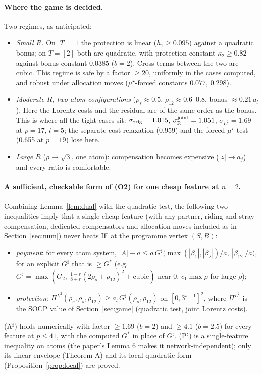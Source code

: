 \documentclass[11pt]{article}
\theoremstyle{definition}
\begin{document}
\paragraph{Where the game is decided.}  Two regimes, as anticipated:
\begin{itemize}
\item[(S)] \emph{Small $R$.}  On $|T|=1$ the protection is linear ($h_1\ge0.095$) against a quadratic bonus; on $T=[2]$ both are quadratic, with protection
constant $\kappa_2\ge0.82$ against bonus constant $0.0385$ ($b=2$).  Cross terms between the two are cubic.  This regime is safe by a factor $\ge20$, uniformly in
the cases computed, and robust under allocation moves ($\mu^\star$-forced constants $0.077$, $0.298$).
\item[(L)] \emph{Moderate $R$, two-atom configurations} ($\rho_s\approx0.5$, $\rho_{12}\approx0.6$--$0.8$, bonus $\approx0.21\,a_l$).  Here the Lorentz
costs and the residual are of the same order as the bonus.  This is where all the tight cases sit: $\sigma_{\rm orig}=1.015$, $\sigma^{\rm joint}_{\rm R}=1.051$,
$\sigma_{L^2}=1.69$ at $p=17$, $l=5$; the separate-cost relaxation (0.959) and the forced-$\mu^\star$ test (0.655 at $p=19$) lose here.
\item[(X)] \emph{Large $R$} ($\rho\to\sqrt3$, one atom): compensation becomes expensive ($|z|\to a_j$) and every ratio is comfortable.
\end{itemize}

\paragraph{A sufficient, checkable form of (O2) for one cheap feature at $n=2$.}  Combining Lemma~\ref{lem:dual} with the quadratic test, the
following two inequalities imply that a single cheap feature (with any partner, riding and stray compensation, dedicated compensators and allocation moves
included as in Section~\ref{sec:num}) never beats IF at the programme vertex $(S,B)$:
\begin{itemize}
\item[(P$^\sharp$)] \emph{payment}: for every atom system, $|A|-a\le a\,G^\sharp\big(\max(|\beta_1|,|\beta_2|)/a,\ |\beta_{12}|/a\big)$, for an explicit
$G^\sharp$ that is $\ge G^*$ (e.g.\ $G^\sharp=\max(G_2,\ \frac{1-r}{8+r}(2\rho_s+\rho_{12})^2+\text{cubic})$ near $0$, $c_1\max\rho$ for large $\rho$);
\item[(A$^\sharp$)] \emph{protection}: $\Pi^{L^2}(\rho_s,\rho_s,\rho_{12})\ge a_l\,G^\sharp(\rho_s,\rho_{12})$ on $[0,3^{s-1}]^2$, where $\Pi^{L^2}$ is the SOCP value of
Section~\ref{sec:game} (quadratic test, joint Lorentz costs).
\end{itemize}
(A$^\sharp$) holds numerically with factor $\ge1.69$ ($b=2$) and $\ge4.1$ ($b=2.5$) for every feature at $p\le41$, with the computed $G^*$ in place of $G^\sharp$.
(P$^\sharp$) is a single-feature inequality on atoms (the paper's Lemma 6 makes it network-independent); only its linear envelope (Theorem A) and its
local quadratic form (Proposition~\ref{prop:local}) are proved.
\end{document}
